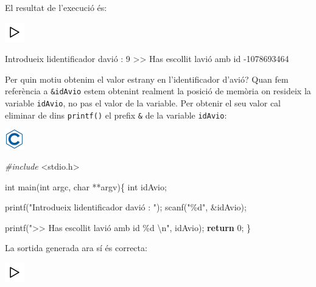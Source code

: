 \documentclass[
]{book}
\newenvironment{Shaded}{\begin{snugshade}}{\end{snugshade}}
\newcommand{\ControlFlowTok}[1]{\textcolor[rgb]{0.13,0.29,0.53}{\textbf{#1}}}
\newcommand{\DataTypeTok}[1]{\textcolor[rgb]{0.13,0.29,0.53}{#1}}
\newcommand{\DecValTok}[1]{\textcolor[rgb]{0.00,0.00,0.81}{#1}}
\newcommand{\ImportTok}[1]{#1}
\newcommand{\NormalTok}[1]{#1}
\newcommand{\PreprocessorTok}[1]{\textcolor[rgb]{0.56,0.35,0.01}{\textit{#1}}}
\newcommand{\SpecialCharTok}[1]{\textcolor[rgb]{0.00,0.00,0.00}{#1}}
\newcommand{\StringTok}[1]{\textcolor[rgb]{0.31,0.60,0.02}{#1}}
\begin{document}
El resultat de l'execució és:

\includegraphics{./img/play.png}

\begin{Shaded}
\begin{Highlighting}[]
\NormalTok{Introdueix l\textquotesingle{}identificador d\textquotesingle{}avió : }\DecValTok{9}
\NormalTok{\textgreater{}\textgreater{} Has escollit l\textquotesingle{}avió amb id {-}}\DecValTok{1078693464}
\end{Highlighting}
\end{Shaded}

Per quin motiu obtenim el valor estrany en l'identificador d'avió? Quan fem referència a \texttt{\&idAvio} estem obtenint realment la posició de memòria on resideix la variable \texttt{idAvio}, no pas el valor de la variable. Per obtenir el seu valor cal eliminar de dins \texttt{printf()} el prefix \texttt{\&} de la variable \texttt{idAvio}:

\includegraphics{./img/c.png}

\begin{Shaded}
\begin{Highlighting}[]
\PreprocessorTok{\#include }\ImportTok{\textless{}stdio.h\textgreater{}}

\DataTypeTok{int}\NormalTok{ main(}\DataTypeTok{int}\NormalTok{ argc, }\DataTypeTok{char}\NormalTok{ **argv)\{}
    \DataTypeTok{int}\NormalTok{ idAvio;}

\NormalTok{    printf(}\StringTok{"Introdueix l\textquotesingle{}identificador d\textquotesingle{}avió : "}\NormalTok{);}
\NormalTok{    scanf(}\StringTok{"\%d"}\NormalTok{, \&idAvio);}
    
\NormalTok{    printf(}\StringTok{"\textgreater{}\textgreater{} Has escollit l\textquotesingle{}avió amb id \%d }\SpecialCharTok{\textbackslash{}n}\StringTok{"}\NormalTok{, idAvio);}
    \ControlFlowTok{return} \DecValTok{0}\NormalTok{;}
\NormalTok{\}}
\end{Highlighting}
\end{Shaded}

La sortida generada ara sí és correcta:

\includegraphics{./img/play.png}
\end{document}
